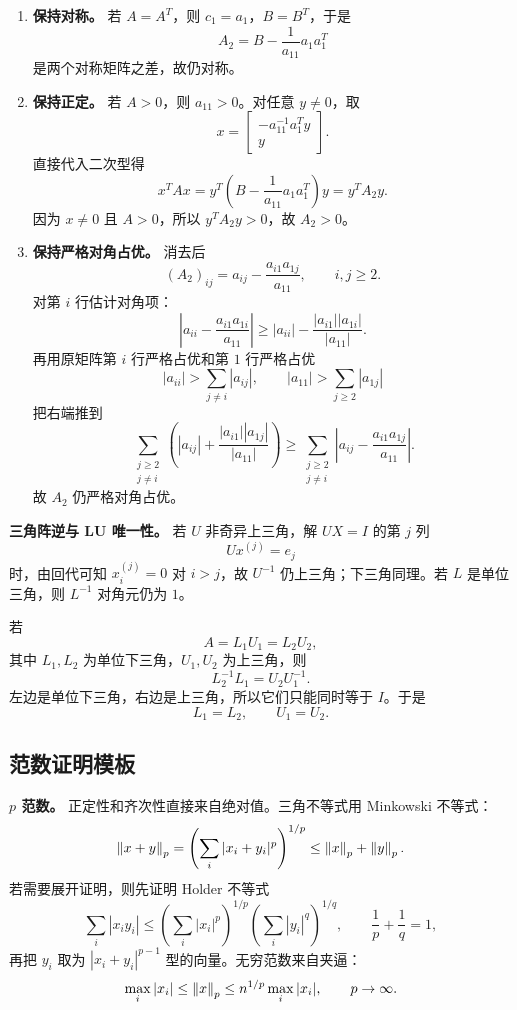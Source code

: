 \documentclass{article}
\begin{document}
\begin{enumerate}
  \item \textbf{保持对称。} 若 $A=A^T$，则 $c_1=a_1$，$B=B^T$，于是
  \[
    A_2=B-\frac1{a_{11}}a_1a_1^T
  \]
  是两个对称矩阵之差，故仍对称。

  \item \textbf{保持正定。} 若 $A>0$，则 $a_{11}>0$。对任意 $y\ne0$，取
  \[
    x=\begin{bmatrix}
      -a_{11}^{-1}a_1^Ty\\y
    \end{bmatrix}.
  \]
  直接代入二次型得
  \[
    x^TAx=y^T\left(B-\frac1{a_{11}}a_1a_1^T\right)y
    =y^TA_2y.
  \]
  因为 $x\ne0$ 且 $A>0$，所以 $y^TA_2y>0$，故 $A_2>0$。

  \item \textbf{保持严格对角占优。} 消去后
  \[
    (A_2)_{ij}=a_{ij}-\frac{a_{i1}a_{1j}}{a_{11}},\qquad i,j\ge2.
  \]
  对第 $i$ 行估计对角项：
  \[
    \left|a_{ii}-\frac{a_{i1}a_{1i}}{a_{11}}\right|
    \ge |a_{ii}|-\frac{|a_{i1}||a_{1i}|}{|a_{11}|}.
  \]
  再用原矩阵第 $i$ 行严格占优和第 $1$ 行严格占优
  \[
    |a_{ii}|>\sum_{j\ne i}|a_{ij}|,\qquad
    |a_{11}|>\sum_{j\ge2}|a_{1j}|
  \]
  把右端推到
  \[
    \sum_{\substack{j\ge2\\j\ne i}}
    \left(|a_{ij}|+\frac{|a_{i1}||a_{1j}|}{|a_{11}|}\right)
    \ge
    \sum_{\substack{j\ge2\\j\ne i}}
    \left|a_{ij}-\frac{a_{i1}a_{1j}}{a_{11}}\right|.
  \]
  故 $A_2$ 仍严格对角占优。
\end{enumerate}

\textbf{三角阵逆与 LU 唯一性。} 若 $U$ 非奇异上三角，解 $UX=I$ 的第 $j$ 列
\[
  Ux^{(j)}=e_j
\]
时，由回代可知 $x_i^{(j)}=0$ 对 $i>j$，故 $U^{-1}$ 仍上三角；下三角同理。若 $L$ 是单位三角，则 $L^{-1}$ 对角元仍为 $1$。

若
\[
  A=L_1U_1=L_2U_2,
\]
其中 $L_1,L_2$ 为单位下三角，$U_1,U_2$ 为上三角，则
\[
  L_2^{-1}L_1=U_2U_1^{-1}.
\]
左边是单位下三角，右边是上三角，所以它们只能同时等于 $I$。于是
\[
  L_1=L_2,\qquad U_1=U_2.
\]

\subsection{范数证明模板}

\textbf{$p$ 范数。} 正定性和齐次性直接来自绝对值。三角不等式用 Minkowski 不等式：
\[
  \left\| x+y \right\|_p
  =\left(\sum_i |x_i+y_i|^p\right)^{1/p}
  \le\left\| x \right\|_p+\left\| y \right\|_p.
\]
若需要展开证明，则先证明 Holder 不等式
\[
  \sum_i |x_iy_i|
  \le
  \left(\sum_i |x_i|^p\right)^{1/p}
  \left(\sum_i |y_i|^q\right)^{1/q},
  \qquad \frac1p+\frac1q=1,
\]
再把 $y_i$ 取为 $|x_i+y_i|^{p-1}$ 型的向量。无穷范数来自夹逼：
\[
  \max_i|x_i|\le\left\| x \right\|_p\le n^{1/p}\max_i|x_i|,
  \qquad p\to\infty.
\]
\end{document}
